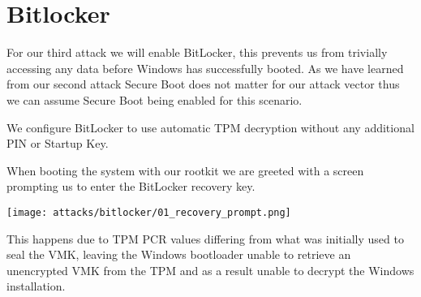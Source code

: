 \section{Bitlocker}


For our third attack we will enable BitLocker, this prevents us from trivially accessing any data before Windows has successfully booted.
 As we have learned from our second attack Secure Boot does not matter for our attack vector thus we can assume Secure Boot being enabled for this scenario.

We configure BitLocker to use automatic TPM decryption without any additional PIN or Startup Key.

When booting the system with our rootkit we are greeted with a screen prompting us to enter the BitLocker recovery key.

\texttt{[image: attacks/bitlocker/01\_recovery\_prompt.png]}

This happens due to TPM PCR values differing from what was initially used to seal the VMK, leaving the Windows bootloader unable to retrieve an unencrypted VMK from the TPM and as a result unable to decrypt the Windows installation. 



